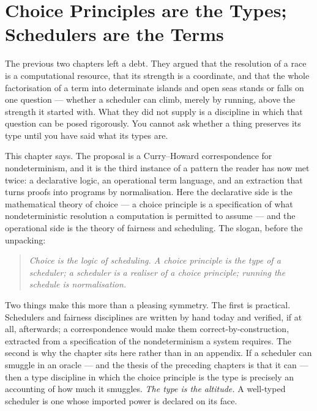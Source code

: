\chapter{Choice Principles are the Types; Schedulers are the Terms}
\label{ch:chs}

\noindent
The previous two chapters left a debt. They argued that the resolution of a race is a
computational resource, that its strength is a coordinate, and that the whole
factorisation of a term into determinate islands and open seas stands or falls on one
question --- whether a scheduler can climb, merely by running, above the strength it
started with. What they did not supply is a discipline in which that question can be
posed rigorously. You cannot ask whether a thing preserves its type until you have said
what its types are.

This chapter says. The proposal is a Curry--Howard correspondence for nondeterminism,
and it is the third instance of a pattern the reader has now met twice: a declarative
logic, an operational term language, and an extraction that turns proofs into programs
by normalisation. Here the declarative side is the mathematical theory of choice --- a
choice principle is a specification of what nondeterministic resolution a computation
is permitted to assume --- and the operational side is the theory of fairness and
scheduling. The slogan, before the unpacking:

\begin{quote}
\emph{Choice is the logic of scheduling. A choice principle is the type of a scheduler;
a scheduler is a realiser of a choice principle; running the schedule is
normalisation.}
\end{quote}

\noindent
Two things make this more than a pleasing symmetry. The first is practical. Schedulers
and fairness disciplines are written by hand today and verified, if at all, afterwards;
a correspondence would make them correct-by-construction, extracted from a
specification of the nondeterminism a system requires. The second is why the chapter
sits here rather than in an appendix. If a scheduler can smuggle in an oracle --- and
the thesis of the preceding chapters is that it can --- then a type discipline in which
the choice principle is the type is precisely an accounting of how much it smuggles.
\emph{The type is the altitude.} A well-typed scheduler is one whose imported power is
declared on its face.

